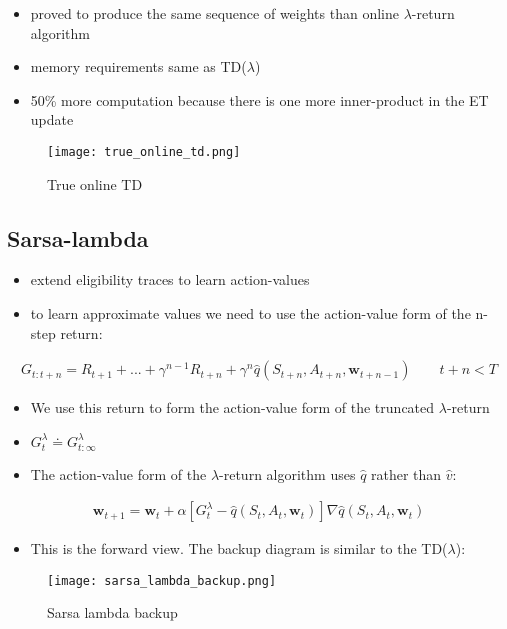 \documentclass[sutton_barto_notes.tex]{subfiles}
\begin{document}
\begin{itemize}
\item proved to produce the same sequence of weights than online $\lambda$-return algorithm 
\item memory requirements same as TD($\lambda$) 
\item 50\% more computation because there is one more inner-product in the ET update 
\end{itemize}
\begin{figure}[h!]
    \centering
     \texttt{[image: true\_online\_td.png]}
    \caption{ True online TD }
\end{figure}

\subsection{Sarsa-lambda}

\begin{itemize}
\item extend eligibility traces to learn action-values 
\item to learn approximate values we need to use the action-value form of the n-step return: 
\end{itemize}
\begin{align}
G_{t:t+n} = R_{t+1} + ... + \gamma^{n-1} R_{t+n} + \gamma^n \hat{q}(S_{t+n}, A_{t+n}, \mathbf{w}_{t+n-1}) \quad \quad t + n < T \label{eq:12.12}\tag{12.12}
\end{align}
\begin{itemize}
\item We use this return to form the action-value form of the truncated $\lambda$-return 
\item $G_t^{\lambda} \doteq G_{t:\infty}^{\lambda}$ 
\item The action-value form of the $\lambda$-return algorithm uses $\hat{q}$ rather than $\hat{v}$: 
\end{itemize}
\begin{align}
\mathbf{w}_{t+1} = \mathbf{w}_{t} + \alpha [G_t^\lambda - \hat{q}(S_t, A_t, \mathbf{w}_{t})] \nabla \hat{q}(S_t, A_t, \mathbf{w}_{t}) \label{eq:12.13}\tag{12.13}
\end{align}
\begin{itemize}
\item This is the forward view. The backup diagram is similar to the TD($\lambda$): 
\end{itemize}
\begin{figure}[h!]
    \centering
     \texttt{[image: sarsa\_lambda\_backup.png]}
    \caption{ Sarsa lambda backup }
\end{figure}
\end{document}
